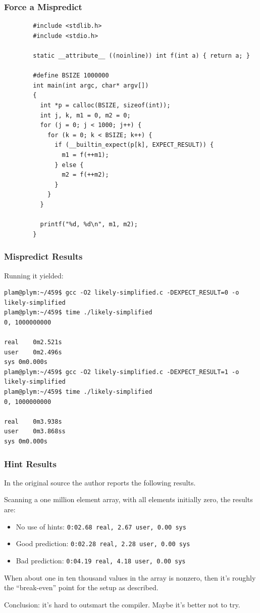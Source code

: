\begin{frame}[fragile]
\frametitle{Force a Mispredict}
{\scriptsize
\begin{verbatim}
        #include <stdlib.h>
        #include <stdio.h>

        static __attribute__ ((noinline)) int f(int a) { return a; }

        #define BSIZE 1000000
        int main(int argc, char* argv[]) 
        {
          int *p = calloc(BSIZE, sizeof(int));
          int j, k, m1 = 0, m2 = 0;
          for (j = 0; j < 1000; j++) {
            for (k = 0; k < BSIZE; k++) {
              if (__builtin_expect(p[k], EXPECT_RESULT)) {
                m1 = f(++m1);
              } else {
                m2 = f(++m2);
              }
            }
          }

          printf("%d, %d\n", m1, m2);
        }
\end{verbatim}
}

\end{frame}



\begin{frame}[fragile]
\frametitle{Mispredict Results}

Running it yielded:
{\scriptsize
\begin{verbatim}
plam@plym:~/459$ gcc -O2 likely-simplified.c -DEXPECT_RESULT=0 -o likely-simplified
plam@plym:~/459$ time ./likely-simplified
0, 1000000000

real	0m2.521s
user	0m2.496s
sys	0m0.000s
plam@plym:~/459$ gcc -O2 likely-simplified.c -DEXPECT_RESULT=1 -o likely-simplified
plam@plym:~/459$ time ./likely-simplified
0, 1000000000

real	0m3.938s
user	0m3.868ss
sys	0m0.000s
\end{verbatim}
}
\end{frame}



\begin{frame}
\frametitle{Hint Results}

In the original source the author reports the following results.

Scanning a one million element array, with all elements initially zero, the results are:

\begin{itemize}
	\item No use of hints: \texttt{0:02.68 real,  2.67 user, 0.00 sys}
	\item Good prediction: \texttt{0:02.28 real,  2.28 user, 0.00 sys}
	\item Bad prediction: \texttt{0:04.19 real,  4.18 user, 0.00 sys}
\end{itemize}

When about one in ten thousand values in the array is nonzero, then it's roughly the ``break-even'' point for the setup as described.

Conclusion: it's hard to outsmart the compiler. Maybe it's better not to try.

\end{frame}



